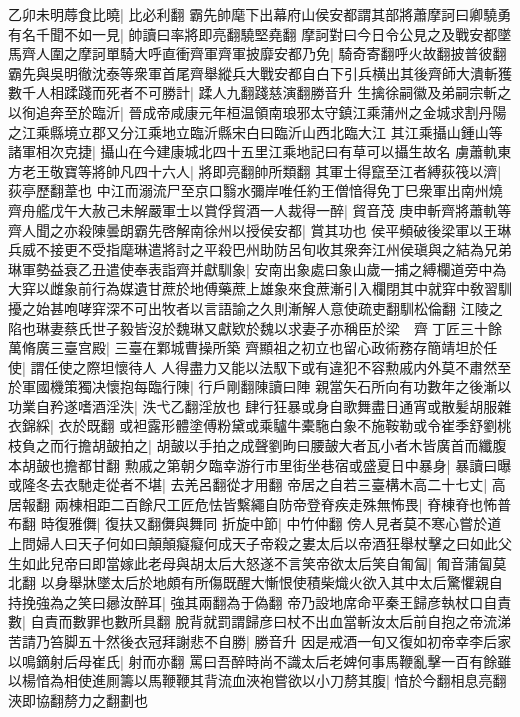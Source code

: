 乙卯未明蓐食比曉|{
	比必利翻}
霸先帥麾下出幕府山侯安都謂其部將蕭摩訶曰卿驍勇有名千聞不如一見|{
	帥讀曰率將即亮翻驍堅堯翻}
摩訶對曰今日令公見之及戰安都墜馬齊人圍之摩訶單騎大呼直衝齊軍齊軍披靡安都乃免|{
	騎奇寄翻呼火故翻披普彼翻}
霸先與吳明徹沈泰等衆軍首尾齊舉縱兵大戰安都自白下引兵横出其後齊師大潰斬獲數千人相蹂踐而死者不可勝計|{
	蹂人九翻踐慈演翻勝音升}
生擒徐嗣徽及弟嗣宗斬之以徇追奔至於臨沂|{
	晉成帝咸康元年桓温領南琅邪太守鎮江乘蒲州之金城求割丹陽之江乘縣境立郡又分江乘地立臨沂縣宋白曰臨沂山西北臨大江}
其江乘攝山鍾山等諸軍相次克捷|{
	攝山在今建康城北四十五里江乘地記曰有草可以攝生故名}
虜蕭軌東方老王敬寶等將帥凡四十六人|{
	將即亮翻帥所類翻}
其軍士得竄至江者縛荻筏以濟|{
	荻亭歷翻葦也}
中江而溺流尸至京口翳水彌岸唯任約王僧愔得免丁巳衆軍出南州燒齊舟艦戊午大赦己未解嚴軍士以賞俘貿酒一人裁得一醉|{
	貿音茂}
庚申斬齊將蕭軌等齊人聞之亦殺陳曇朗霸先啓解南徐州以授侯安都|{
	賞其功也}
侯平頻破後梁軍以王琳兵威不接更不受指麾琳遣將討之平殺巴州助防呂旬收其衆奔江州侯瑱與之結為兄弟琳軍勢益衰乙丑遣使奉表詣齊并獻馴象|{
	安南出象處曰象山歲一捕之縛欄道旁中為大穽以雌象前行為媒遺甘蔗於地傅藥蔗上雄象來食蔗漸引入欄閉其中就穽中敎習馴擾之始甚咆哮穽深不可出牧者以言語諭之久則漸解人意使疏吏翻馴松倫翻}
江陵之陷也琳妻蔡氏世子毅皆沒於魏琳又獻欵於魏以求妻子亦稱臣於梁　齊丁匠三十餘萬脩廣三臺宫殿|{
	三臺在鄴城曹操所築}
齊顯祖之初立也留心政術務存簡靖坦於任使|{
	謂任使之際坦懷待人}
人得盡力又能以法馭下或有違犯不容勲戚内外莫不肅然至於軍國機策獨决懷抱每臨行陳|{
	行戶剛翻陳讀曰陣}
親當矢石所向有功數年之後漸以功業自矜遂嗜酒淫泆|{
	泆弋乙翻淫放也}
肆行狂暴或身自歌舞盡日通宵或散髪胡服雜衣錦綵|{
	衣於既翻}
或袒露形體塗傅粉黛或乘驢牛橐駞白象不施鞍勒或令崔季舒劉桃枝負之而行擔胡皷拍之|{
	胡皷以手拍之成聲劉昫曰腰皷大者瓦小者木皆廣首而纖腹本胡皷也擔都甘翻}
勲戚之第朝夕臨幸游行市里街坐巷宿或盛夏日中暴身|{
	暴讀曰曝}
或隆冬去衣馳走從者不堪|{
	去羌呂翻從才用翻}
帝居之自若三臺構木高二十七丈|{
	高居報翻}
兩棟相距二百餘尺工匠危怯皆繫繩自防帝登脊疾走殊無怖畏|{
	脊棟脊也怖普布翻}
時復雅儛|{
	復扶又翻儛與舞同}
折旋中節|{
	中竹仲翻}
傍人見者莫不寒心嘗於道上問婦人曰天子何如曰顛顛癡癡何成天子帝殺之婁太后以帝酒狂舉杖擊之曰如此父生如此兒帝曰即當嫁此老母與胡太后大怒遂不言笑帝欲太后笑自匍匐|{
	匍音蒲匐莫北翻}
以身舉牀墜太后於地頗有所傷既醒大慚恨使積柴熾火欲入其中太后驚懼親自持挽強為之笑曰曏汝醉耳|{
	強其兩翻為于偽翻}
帝乃設地席命平秦王歸彦執杖口自責數|{
	自責而數罪也數所具翻}
脫背就罰謂歸彦曰杖不出血當斬汝太后前自抱之帝流涕苦請乃笞脚五十然後衣冠拜謝悲不自勝|{
	勝音升}
因是戒酒一旬又復如初帝幸李后家以鳴鏑射后母崔氏|{
	射而亦翻}
罵曰吾醉時尚不識太后老婢何事馬鞭亂擊一百有餘雖以楊愔為相使進厠籌以馬鞭鞭其背流血浹袍嘗欲以小刀剺其腹|{
	愔於今翻相息亮翻浹即協翻剺力之翻劃也}

